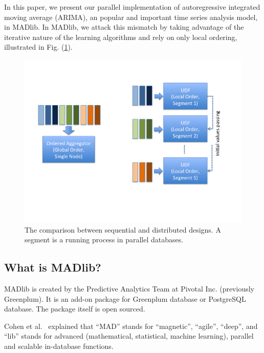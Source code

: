 \documentclass[english,10pt]{llncs}
\begin{document}
In this paper, we present our parallel implementation of autoregressive integrated moving average (ARIMA), an popular and important time series analysis model, in MADlib.
In MADlib, we attack this mismatch by taking advantage of the iterative nature of the learning algorithms and rely on only local ordering, illustrated in Fig. (\ref{fig:seq_vs_dist}).
\begin{figure}[ht]
  \begin{centering}
    \includegraphics[width=\textwidth]{sequential_vs_distributed.png}
  \end{centering}
  \caption{\label{fig:seq_vs_dist} The comparison between sequential
    and distributed designs. A segment is a running process in parallel databases.}
\end{figure}


\subsection{What is MADlib?}


MADlib is created by the Predictive Analytics Team at Pivotal Inc. (previously
Greenplum). It is an add-on package for Greenplum database or PostgreSQL
database. The package itself is open sourced.

Cohen et al.~\cite{mad-skills} explained that ``MAD'' stands for ``magnetic'',
``agile'', ``deep'', and ``lib'' stands for advanced (mathematical, statistical,
machine learning), parallel and scalable in-database functions.
\end{document}
